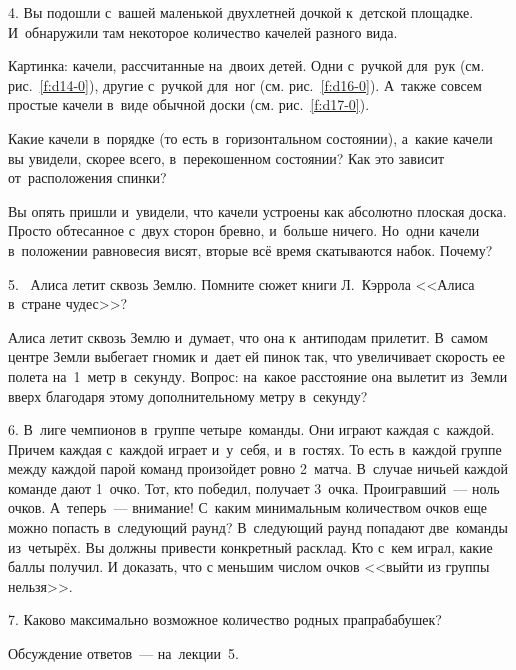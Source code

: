 4. Вы подошли с~вашей маленькой двухлетней дочкой к~детской площадке. И~обнаружили там некоторое
количество качелей разного вида.

Картинка: качели, рассчитанные на~двоих детей. Одни с~ручкой для~рук (см. рис.~\ref{f:d14-0}), другие с~ручкой для~ног (см. рис.~\ref{f:d16-0}).
А~также совсем простые качели в~виде обычной доски (см. рис.~\ref{f:d17-0}).





Какие качели в~порядке (то есть в~горизонтальном состоянии), а~какие качели вы увидели, скорее
всего, в~перекошенном состоянии?
 Как это зависит от~расположения спинки?

Вы опять пришли и~увидели, что качели устроены как абсолютно плоская доска. Просто обтесанное
с~двух сторон бревно, и~больше ничего. Но~одни качели в~положении равновесия висят, вторые всё
время скатываются набок. Почему?


5.~ Алиса летит сквозь Землю. Помните сюжет книги Л.~Кэр\-ро\-ла <<Алиса в~стране чудес>>?

Алиса летит сквозь Землю и~думает, что она к~антиподам прилетит. В~самом центре Земли выбегает
гномик и~дает ей пинок так, что увеличивает скорость ее полета на~1~метр в~секунду. Вопрос:
на~какое расстояние она вылетит из~Земли вверх благодаря этому дополнительному метру в~секунду?

6. В~лиге чемпионов в~группе четыре~команды. Они играют каждая с~каждой. Причем каждая с~каждой
играет и~у~себя, и~в~гостях. То есть в~каждой группе между каждой парой команд произойдет ровно 2~матча.
В~случае ничьей каждой команде дают 1~очко. Тот, кто победил, получает 3~очка.
Проигравший~--- ноль очков. А~теперь~--- внимание! С~каким минимальным количеством очков еще можно
попасть в~следующий раунд? В~следующий раунд попадают две~команды из~четырёх. Вы должны привести
конкретный расклад. Кто с~кем играл, какие баллы получил. И доказать, что с меньшим числом очков <<выйти из группы нельзя>>.

7. Каково максимально возможное количество родных прапрабабушек?

Обсуждение ответов~--- на~лекции~5.

\endinput
